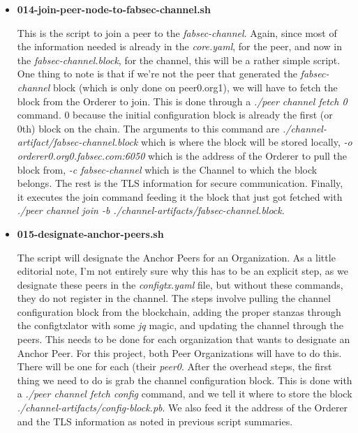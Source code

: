 \begin{itemize}
				\item \textbf{014-join-peer-node-to-fabsec-channel.sh}
					
					\hspace{10mm}This is the script to join a peer to the \textit{fabsec-channel}. Again, since most of the information needed is already in the \textit{core.yaml}, for the peer, and now in the \textit{fabsec-channel.block}, for the channel, this will be a rather simple script. One thing to note is that if we're not the peer that generated the \textit{fabsec-channel} block (which is only done on peer0.org1), we will have to fetch the block from the Orderer to join. This is done through a \textit{./peer channel fetch 0} command. 0 because the initial configuration block is already the first (or 0th) block on the chain. The arguments to this command are \textit{./channel-artifact/fabsec-channel.block} which is where the block will be stored locally, \textit{-o orderer0.org0.fabsec.com:6050} which is the address of the Orderer to pull the block from, \textit{-c fabsec-channel} which is the Channel to which the block belongs. The rest is the TLS information for secure communication. Finally, it executes the join command feeding it the block that just got fetched with \textit{./peer channel join -b ./channel-artifacts/fabsec-channel.block}.
					
				\item \textbf{015-designate-anchor-peers.sh}
				
					\hspace{10mm}The script will designate the Anchor Peers for an Organization. As a little editorial note, I'm not entirely sure why this has to be an explicit step, as we designate these peers in the \textit{configtx.yaml} file, but without these commands, they do not register in the channel. The steps involve pulling the channel configuration block from the blockchain, adding the proper stanzas through the configtxlator with some \textit{jq} magic, and updating the channel through the peers. This needs to be done for each organization that wants to designate an Anchor Peer. For this project, both Peer Organizations will have to do this. There will be one for each (their \textit{peer0}. After the overhead steps, the first thing we need to do is grab the channel configuration block. This is done with a \textit{./peer channel fetch config} command, and we tell it where to store the block \textit{./channel-artifacts/config-block.pb}. We also feed it the address of the Orderer and the TLS information as noted in previous script summaries.\\
					

\end{itemize}
